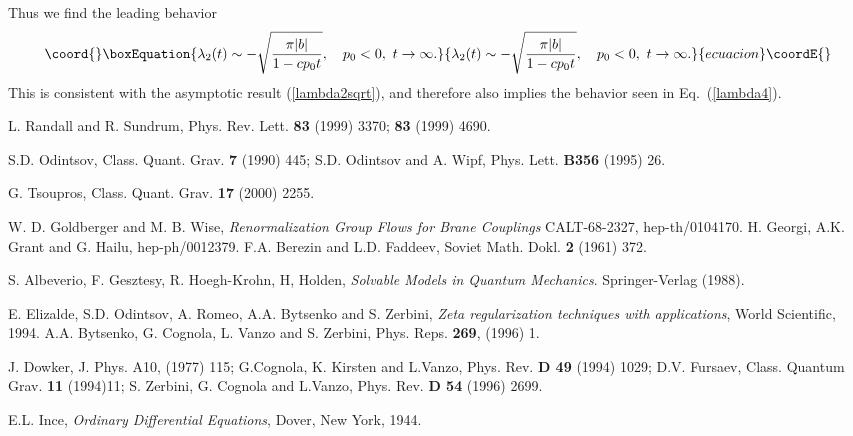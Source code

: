 \documentclass[a4paper,aps,prl,preprint,groupedaddress,showpacs,nobibnotes,tightenlines]{revtex4}
\begin{document}
Thus we find the leading behavior
\begin{equation}\coord{}\boxEquation{
\lambda_2(t)\sim-\sqrt{\pi|b|\over1-cp_0t},\quad p_0<0,\,\,t\to\infty.
}{
\lambda_2(t)\sim-\sqrt{\pi|b|\over1-cp_0t},\quad p_0<0,\,\,t\to\infty.
}{ecuacion}\coordE{}\end{equation}
This is consistent with the asymptotic result (\ref{lambda2sqrt}), 
and therefore also implies the behavior seen in Eq.~(\ref{lambda4}).



 



\begin{thebibliography}{99}

 L. Randall and R. Sundrum, Phys. Rev. Lett. {\bf 83} (1999) 3370;
{\bf 83} (1999) 4690.

 S.D. Odintsov, Class. Quant. Grav. {\bf 7} (1990) 445;
S.D. Odintsov and A. Wipf, Phys. Lett. {\bf B356} (1995) 26.

 G. Tsoupros, Class. Quant. Grav. {\bf 17} (2000) 2255.

W. D. Goldberger and M. B. Wise,
{\em Renormalization Group Flows for Brane Couplings}
CALT-68-2327, hep-th/0104170.
H. Georgi, A.K. Grant and G. Hailu, hep-ph/0012379.
F.A. Berezin and L.D. Faddeev,
Soviet Math. Dokl. {\bf 2} (1961) 372.

S. Albeverio, F. Gesztesy, R. Hoegh-Krohn, H, Holden,
{\em Solvable Models in Quantum Mechanics}.
Springer-Verlag (1988).

E. Elizalde, S.D. Odintsov, A. Romeo, A.A. Bytsenko and S. Zerbini,
{ \em Zeta regularization techniques with applications}, World Scientific, 1994.
A.A. Bytsenko, G. Cognola, L. Vanzo  and S. Zerbini,
Phys. Reps. {\bf 269}, (1996) 1.

J. Dowker, J. Phys. A10, (1977) 115; G.Cognola, K. Kirsten and L.Vanzo,
Phys. Rev. {\bf D 49} (1994) 1029; D.V. Fursaev, Class. Quantum Grav. {\bf 11}
(1994)11; S. Zerbini, G. Cognola and L.Vanzo, 
Phys. Rev. {\bf D 54} (1996) 2699. 
 
 
 E.L. Ince,
{\it Ordinary Differential Equations}, Dover, 
New York, 1944.


\end{thebibliography}
\end{document}
